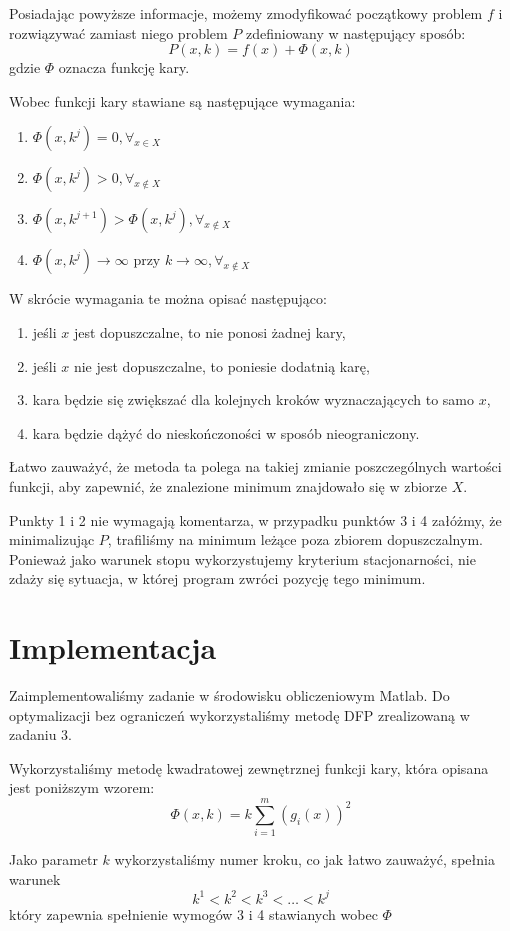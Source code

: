 \documentclass{classrep}
\begin{document}
Posiadając powyższe informacje, możemy zmodyfikować początkowy problem $f$ i rozwiązywać zamiast niego problem $P$ zdefiniowany w następujący sposób:
\begin{equation}
 P(x, k) = f(x) + \Phi(x, k)
\end{equation}
gdzie $\Phi$ oznacza funkcję kary.

Wobec funkcji kary stawiane są następujące wymagania:
\begin{enumerate}
 \item $\Phi(x, k^j) = 0, \displaystyle \forall_{x \in X}$
 \item $\Phi(x, k^j) > 0, \displaystyle \forall_{x \notin X}$
 \item $\Phi(x, k^{j + 1}) > \Phi(x, k^j), \displaystyle \forall_{x \notin X}$
 \item $\Phi(x, k^j) \rightarrow \infty \mbox{ przy } k \rightarrow \infty, \displaystyle \forall_{x \notin X}$
\end{enumerate}

W skrócie wymagania te można opisać następująco:
\begin{enumerate}
 \item jeśli $x$ jest dopuszczalne, to nie ponosi żadnej kary,
 \item jeśli $x$ nie jest dopuszczalne, to poniesie dodatnią karę,
 \item kara będzie się zwiększać dla kolejnych kroków wyznaczających to samo $x$,
 \item kara będzie dążyć do nieskończoności w sposób nieograniczony.
\end{enumerate}

Łatwo zauważyć, że metoda ta polega na takiej zmianie poszczególnych wartości funkcji, aby zapewnić, że znalezione minimum znajdowało się w zbiorze $X$.

Punkty 1 i 2 nie wymagają komentarza, w przypadku punktów 3 i 4 załóżmy, że minimalizując $P$, trafiliśmy na minimum leżące poza zbiorem dopuszczalnym. Ponieważ jako warunek stopu wykorzystujemy kryterium stacjonarności, nie zdaży się sytuacja, w której program zwróci pozycję tego minimum.

\section{Implementacja}
Zaimplementowaliśmy zadanie w środowisku obliczeniowym Matlab. Do optymalizacji bez ograniczeń wykorzystaliśmy metodę DFP zrealizowaną w zadaniu 3.

Wykorzystaliśmy metodę kwadratowej zewnętrznej funkcji kary, która opisana jest poniższym wzorem:
\begin{equation}
 \Phi(x, k) = k \displaystyle \sum^{m}_{i = 1} (g_i(x))^2
\end{equation}

Jako parametr $k$ wykorzystaliśmy numer kroku, co jak łatwo zauważyć, spełnia warunek
\begin{equation}
 k^1 < k^2 < k^3 < \ldots < k^j
\end{equation}
który zapewnia spełnienie wymogów 3 i 4 stawianych wobec $\Phi$
\end{document}
